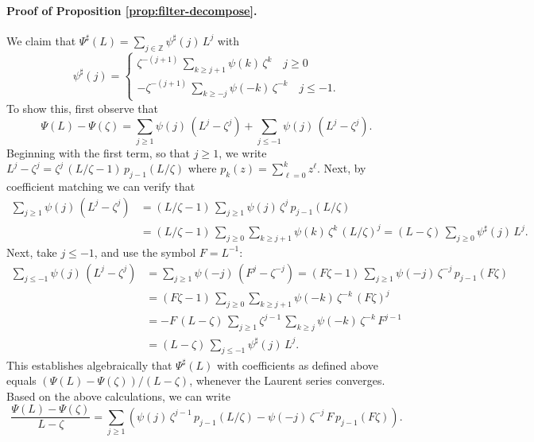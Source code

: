 \documentclass[a4paper]{book}
\def\ZZ{\mathbb Z}
\begin{document}
\paragraph{Proof of Proposition \ref{prop:filter-decompose}.}
 We claim that $\Psi^{\sharp} (L) = \sum_{j \in \ZZ} \psi^{\sharp} (j) \, L^j$ with
\[
 \psi^{\sharp} (j) = \begin{cases}  {\zeta}^{-(j+1)} \,  
 \sum_{k \geq j+1} \psi (k) \, \zeta^k  \quad j \geq 0 \\
					-\zeta^{-(j+1)} \, \sum_{k \geq -j} \psi (-k) \,  
					{\zeta}^{-k} \quad j \leq -1.	
		\end{cases}
\]
To show this, first observe that 
\[
  \Psi (L) - \Psi (\zeta) = \sum_{j \geq 1} \psi (j) \, 
  (L^j - \zeta^j) + \sum_{j \leq -1} \psi (j) \, (L^j - \zeta^j).
\]
 Beginning with the first term, so that $j \geq 1$, we write 
 $L^j - \zeta^j = \zeta^j \, (L/\zeta - 1) \, p_{j-1} (L/\zeta)$
 where $p_k (z) = \sum_{\ell=0}^k z^{\ell}$.   Next, by coefficient
 matching we can verify that
\begin{align*}
   \sum_{j \geq 1} \psi (j) \, (L^j - \zeta^j) & = (L/\zeta - 1) \,
   \sum_{j \geq 1} \psi (j) \, \zeta^j \, p_{j-1} (L/\zeta) \\
 & = (L/\zeta -1) \, \sum_{j \geq 0}  \sum_{k \geq j+1} \psi (k) \,
 \zeta^k \, {(L/\zeta)}^{j}
 = (L - \zeta) \,  \sum_{j \geq 0}  \psi^{\sharp} (j) \, L^j.
\end{align*}
 Next, take $j \leq -1$, and use the symbol $F = L^{-1}$:
\begin{align*}
  \sum_{j \leq -1} \psi (j) \, (L^j - \zeta^j) & = \sum_{j \geq 1}
  \psi (-j) \, (F^j - \zeta^{-j}) 
   =   (F \zeta - 1) \, \sum_{j \geq 1} \psi (-j) \, \zeta^{-j} \, p_{j-1} (F \zeta) \\
 & =  (F \zeta - 1) \, \sum_{j \geq 0} \sum_{k \geq j+1}  
  \psi (-k) \, \zeta^{-k} \, {(F \zeta)}^{j}  \\
 &  =  - F\,  (L - \zeta ) \, \sum_{j \geq 1}  \zeta^{j-1} 
 \, \sum_{k \geq j}  \psi (-k) \, \zeta^{-k} \,  F^{j-1}  \\
 &= (L - \zeta) \, \sum_{j \leq -1}  \psi^{\sharp} (j) \, L^j.
\end{align*}
 This establishes algebraically that $\Psi^{\sharp} (L)$ 
 with coefficients as defined above equals
 $(\Psi (L) - \Psi (\zeta))/(L- \zeta)$, whenever the Laurent
 series converges.  Based on the above calculations, we can write
\[
  \frac{ \Psi (L) - \Psi (\zeta) }{ L - \zeta} 
  = \sum_{j \geq 1} \left( \psi (j) \, \zeta^{j-1} \, p_{j-1}
  (L/\zeta) - \psi (-j) \, \zeta^{-j} \, F \, p_{j-1} (F \zeta) \right).
\]
\end{document}
